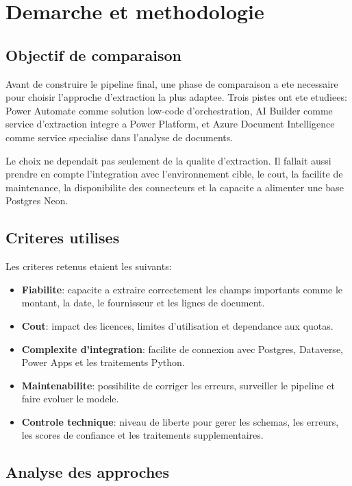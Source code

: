 \chapter{Demarche et methodologie}
\label{chap:demarche-methodologie}

\section{Objectif de comparaison}

Avant de construire le pipeline final, une phase de comparaison a ete necessaire pour choisir l'approche d'extraction la plus adaptee. Trois pistes ont ete etudiees: Power Automate comme solution low-code d'orchestration, AI Builder comme service d'extraction integre a Power Platform, et Azure Document Intelligence comme service specialise dans l'analyse de documents.

Le choix ne dependait pas seulement de la qualite d'extraction. Il fallait aussi prendre en compte l'integration avec l'environnement cible, le cout, la facilite de maintenance, la disponibilite des connecteurs et la capacite a alimenter une base Postgres Neon.

\section{Criteres utilises}

Les criteres retenus etaient les suivants:

\begin{itemize}
  \item \textbf{Fiabilite}: capacite a extraire correctement les champs importants comme le montant, la date, le fournisseur et les lignes de document.
  \item \textbf{Cout}: impact des licences, limites d'utilisation et dependance aux quotas.
  \item \textbf{Complexite d'integration}: facilite de connexion avec Postgres, Dataverse, Power Apps et les traitements Python.
  \item \textbf{Maintenabilite}: possibilite de corriger les erreurs, surveiller le pipeline et faire evoluer le modele.
  \item \textbf{Controle technique}: niveau de liberte pour gerer les schemas, les erreurs, les scores de confiance et les traitements supplementaires.
\end{itemize}

\section{Analyse des approches}


